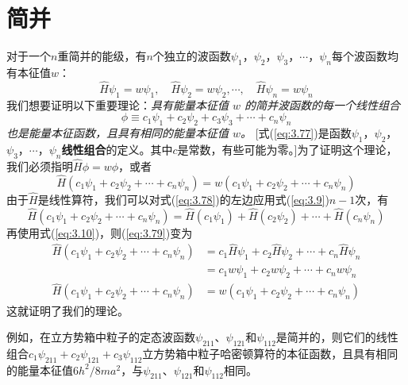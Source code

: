 \section{简并}
\label{sec:3.6 Degeneracy}
	对于一个$n$重简并的能级，有$n$个独立的波函数$\psi_1$，$\psi_2$，$\psi_3$，$\cdots$，$\psi_n$每个波函数均有本征值$w$：
	\begin{equation}
		\hat{H}\psi_1 = w\psi_1, \quad\hat{H}\psi_2 = w\psi_2, \cdots,\quad \hat{H}\psi_n = w\psi_n
		\label{eq:3.76}
	\end{equation}
	我们想要证明以下重要理论：\textit{具有能量本征值 $w$ 的简并波函数的每一个线性组合}
	\begin{equation}
		\phi \equiv c_1\psi_1 + c_2\psi_2 + c_3\psi_3 + \cdots + c_n\psi_n
		\label{eq:3.77}
	\end{equation}
	\textit{也是能量本征函数，且具有相同的能量本征值 $w$。} [式(\ref{eq:3.77})是函数$\psi_1$，$\psi_2$，$\psi_3$，$\cdots$，$\psi_n$\textbf{线性组合}的定义。其中$c$是常数，有些可能为零。]为了证明这个理论，我们必须指明$\hat{H}\phi = w\phi$，或者
	\begin{equation}
		\hat{H}\left(c_1\psi_1 + c_2\psi_2 +  \cdots + c_n\psi_n\right) = w\left(c_1\psi_1 + c_2\psi_2 + \cdots + c_n\psi_n\right)
		\label{eq:3.78}
	\end{equation}	
	由于$\hat{H}$是线性算符，我们可以对式(\ref{eq:3.78})的左边应用式(\ref{eq:3.9})$n-1$次，有
	\begin{equation*}
		\hat{H}\left(c_1\psi_1 + c_2\psi_2 +  \cdots + c_n\psi_n\right) = \hat{H}\left(c_1\psi_1\right) + \hat{H}\left(c_2\psi_2\right) + \cdots + \hat{H}\left(c_n\psi_n\right)
	\end{equation*}
	再使用式(\ref{eq:3.10})，则(\ref{eq:3.79})变为
	\begin{equation*}
		\begin{aligned}
			\hat{H}\left(c_1\psi_1 + c_2\psi_2 +  \cdots + c_n\psi_n\right) &= c_1\hat{H}\psi_1 + c_2\hat{H}\psi_2 +  \cdots + c_n\hat{H}\psi_n \\
			&= c_1w\psi_1 + c_2w\psi_2 +  \cdots + c_nw\psi_n \\
			\hat{H}\left(c_1\psi_1 + c_2\psi_2 +  \cdots + c_n\psi_n\right) &= w\left(c_1\psi_1 + c_2\psi_2 +  \cdots + c_n\psi_n\right)
		\end{aligned}
	\end{equation*}
	这就证明了我们的理论。

	例如，在立方势箱中粒子的定态波函数$\psi_{211}$、$\psi_{121}$和$\psi_{112}$是简并的，则它们的线性组合$c_1\psi_{211} + c_2\psi_{121} + c_3\psi_{112}$立方势箱中粒子哈密顿算符的本征函数，且具有相同的能量本征值$6h^2/8ma^2$，与$\psi_{211}$、$\psi_{121}$和$\psi_{112}$相同。

